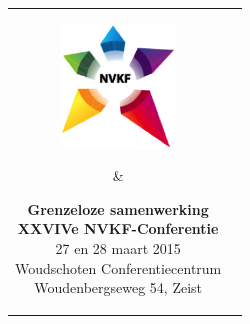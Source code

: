 \documentclass[a4paper,10pt]{report}
\begin{document}
\pagestyle{empty}
\thispagestyle{empty}

\begin{multicols*}{3}

\noindent
\begin{tabular}{cc}
    \parbox[b]{0.4\linewidth}{%
\includegraphics[width=3cm]{nvkf_logo}
}
& 
\parbox[b]{0.6\linewidth}{%
\begin{center}
{\bfseries Grenzeloze samenwerking}\\ \vspace{0.15cm} 
{\bfseries XXVIVe NVKF-Conferentie}\\ \vspace{0.15cm}
{27 en 28 maart 2015}\\ \vspace{0.15cm}
{Woudschoten Conferentiecentrum}\\
{Woudenbergseweg 54, Zeist}

\end{center}
}
\end{tabular}


\newcommand{\plenairheader}[2]{%
\begin{center}
{\color{Blue}{\textbf{#1}}}\\
{\textbf{#2}}
\end{center}
}

\newcommand{\parallelheader}[2]{%
\parskip=0pt
\noindent{{\color{Blue}{\textbf{\textit{{#1}}}}}\hfill{\textit{{#2}}}}\vspace{-0.2cm}
}

\newcommand{\parallelitem}[1]{%
\noindent \hfill{\color{Blue}{\textbf{\textsc{{#1}}}}}\hfill\strut
}

\newenvironment{packed_enum}{%
    \begin{enumerate}
    \setlength{\itemsep}{1pt}
    \setlength{\itemindent}{0pt}
    \setlength{\parskip}{0pt}
    \setlength{\parsep}{0pt}
    \setlength{\leftmargin}{0pt}
}{\end{enumerate}}


\end{multicols*}
\end{document}
